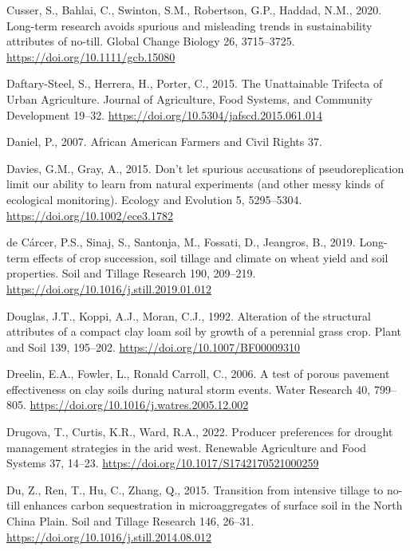 \documentclass[
  12pt,
]{article}
\newlength{\cslhangindent}
\newlength{\cslentryspacingunit} %
\newenvironment{CSLReferences}[2] %
 {%
  \setlength{\parindent}{0pt}
  \ifodd #1
  \let\oldpar\par
  \def\par{\hangindent=\cslhangindent\oldpar}
  \fi
  \setlength{\parskip}{#2\cslentryspacingunit}
 }%
 {}
\begin{document}
\begin{CSLReferences}{1}{0}
\leavevmode{}%
Cusser, S., Bahlai, C., Swinton, S.M., Robertson, G.P., Haddad, N.M., 2020. Long-term research avoids spurious and misleading trends in sustainability attributes of no-till. Global Change Biology 26, 3715--3725. \url{https://doi.org/10.1111/gcb.15080}

\leavevmode{}%
Daftary-Steel, S., Herrera, H., Porter, C., 2015. The {Unattainable Trifecta} of {Urban Agriculture}. Journal of Agriculture, Food Systems, and Community Development 19--32. \url{https://doi.org/10.5304/jafscd.2015.061.014}

\leavevmode{}%
Daniel, P., 2007. African {American Farmers} and {Civil Rights} 37.

\leavevmode{}%
Davies, G.M., Gray, A., 2015. Don't let spurious accusations of pseudoreplication limit our ability to learn from natural experiments (and other messy kinds of ecological monitoring). Ecology and Evolution 5, 5295--5304. \url{https://doi.org/10.1002/ece3.1782}

\leavevmode{}%
de Cárcer, P.S., Sinaj, S., Santonja, M., Fossati, D., Jeangros, B., 2019. Long-term effects of crop succession, soil tillage and climate on wheat yield and soil properties. Soil and Tillage Research 190, 209--219. \url{https://doi.org/10.1016/j.still.2019.01.012}

\leavevmode{}%
Douglas, J.T., Koppi, A.J., Moran, C.J., 1992. Alteration of the structural attributes of a compact clay loam soil by growth of a perennial grass crop. Plant and Soil 139, 195--202. \url{https://doi.org/10.1007/BF00009310}

\leavevmode{}%
Dreelin, E.A., Fowler, L., Ronald Carroll, C., 2006. A test of porous pavement effectiveness on clay soils during natural storm events. Water Research 40, 799--805. \url{https://doi.org/10.1016/j.watres.2005.12.002}

\leavevmode{}%
Drugova, T., Curtis, K.R., Ward, R.A., 2022. Producer preferences for drought management strategies in the arid west. Renewable Agriculture and Food Systems 37, 14--23. \url{https://doi.org/10.1017/S1742170521000259}

\leavevmode{}%
Du, Z., Ren, T., Hu, C., Zhang, Q., 2015. Transition from intensive tillage to no-till enhances carbon sequestration in microaggregates of surface soil in the {North China Plain}. Soil and Tillage Research 146, 26--31. \url{https://doi.org/10.1016/j.still.2014.08.012}


\end{CSLReferences}
\end{document}
